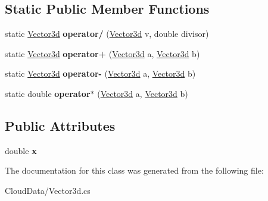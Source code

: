 \subsection*{Static Public Member Functions}
\begin{DoxyCompactItemize}
\item 
\mbox{\label{class_cloud_data_1_1_vector3d_aceaf280765581c7b4f6640fde768c358}} 
static \hyperlink{class_cloud_data_1_1_vector3d}{Vector3d} {\bfseries operator/} (\hyperlink{class_cloud_data_1_1_vector3d}{Vector3d} v, double divisor)
\item 
\mbox{\label{class_cloud_data_1_1_vector3d_aa43cbef9652a38103a8a2e69160fe1bd}} 
static \hyperlink{class_cloud_data_1_1_vector3d}{Vector3d} {\bfseries operator+} (\hyperlink{class_cloud_data_1_1_vector3d}{Vector3d} a, \hyperlink{class_cloud_data_1_1_vector3d}{Vector3d} b)
\item 
\mbox{\label{class_cloud_data_1_1_vector3d_a0ee87d5fd376a06e4b773608b7e77398}} 
static \hyperlink{class_cloud_data_1_1_vector3d}{Vector3d} {\bfseries operator-\/} (\hyperlink{class_cloud_data_1_1_vector3d}{Vector3d} a, \hyperlink{class_cloud_data_1_1_vector3d}{Vector3d} b)
\item 
\mbox{\label{class_cloud_data_1_1_vector3d_a211814063abd268494242f20e8d3672e}} 
static double {\bfseries operator$\ast$} (\hyperlink{class_cloud_data_1_1_vector3d}{Vector3d} a, \hyperlink{class_cloud_data_1_1_vector3d}{Vector3d} b)
\end{DoxyCompactItemize}
\subsection*{Public Attributes}
\begin{DoxyCompactItemize}
\item 
\mbox{\label{class_cloud_data_1_1_vector3d_a40246eb4468163107d2d8502e6cc9dce}} 
double {\bfseries x}
\end{DoxyCompactItemize}


The documentation for this class was generated from the following file\+:\begin{DoxyCompactItemize}
\item 
Cloud\+Data/Vector3d.\+cs\end{DoxyCompactItemize}
